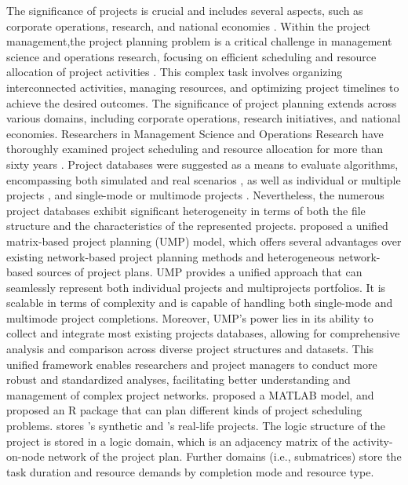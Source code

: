 \documentclass[preprint,
3p]{elsarticle} %
\begin{document}
The significance of projects is crucial and includes several aspects,
such as corporate operations, research, and national economies
\citep{DENIZER2013projGDP}. Within the project management,the project
planning problem is a critical challenge in management science and
operations research, focusing on efficient scheduling and resource
allocation of project activities \citep{hartmann2022updated}. This
complex task involves organizing interconnected activities, managing
resources, and optimizing project timelines to achieve the desired
outcomes. The significance of project planning extends across various
domains, including corporate operations, research initiatives, and
national economies. Researchers in Management Science and Operations
Research have thoroughly examined project scheduling and resource
allocation for more than sixty years \citep{Franco2019review}. Project
databases were suggested as a means to evaluate algorithms, encompassing
both simulated \citep{boctor1993heuristics} and real scenarios
\citep{batselier2015construction}, as well as individual
\citep{sprecher1996psplib} or multiple projects
\citep{browning2010random}, and single-mode
\citep{patterson1984comparison} or multimode projects
\citep{Vanpeteghem2014}. Nevertheless, the numerous project databases
exhibit significant heterogeneity in terms of both the file structure
and the characteristics of the represented projects.
\citet{kosztyan2023matrix} proposed a unified matrix-based project
planning (UMP) model, which offers several advantages over existing
network-based project planning methods and heterogeneous network-based
sources of project plans. UMP provides a unified approach that can
seamlessly represent both individual projects and multiprojects
portfolios. It is scalable in terms of complexity and is capable of
handling both single-mode and multimode project completions. Moreover,
UMP's power lies in its ability to collect and integrate most existing
projects databases, allowing for comprehensive analysis and comparison
across diverse project structures and datasets. This unified framework
enables researchers and project managers to conduct more robust and
standardized analyses, facilitating better understanding and management
of complex project networks. \citet{kosztyan2022mfpp} proposed a MATLAB
model, and \citet{mfpppkg} proposed an R package that can plan different
kinds of project scheduling problems. \citet{mfpppkg} stores
\citep{boctor1993heuristics}'s synthetic and
\citet{batselier2015construction}'s real-life projects. The logic
structure of the project is stored in a logic domain, which is an
adjacency matrix of the activity-on-node network of the project plan.
Further domains (i.e., submatrices) store the task duration and resource
demands by completion mode and resource type.
\end{document}
